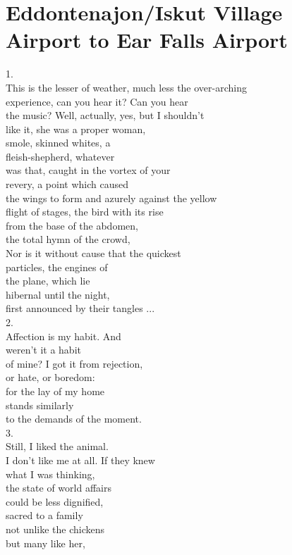 \documentclass[smalldemyvopaper,11pt,twoside,onecolumn,openright,extrafontsizes]{memoir}
\begin{document}
\chapter{Eddontenajon/Iskut Village Airport to Ear Falls Airport}
1.
\\This is the lesser of weather, much less the over-arching
\\experience, can you hear it? Can you hear
\\the music? Well, actually, yes, but I shouldn't
\\like it, she was a proper woman,
\\smole, skinned whites, a
\\fleish-shepherd, whatever
\\was that, caught in the vortex of your
\\revery, a point which caused
\\the wings to form and azurely against the yellow
\\flight of stages, the bird with its rise
\\from the base of the abdomen,
\\the total hymn of the crowd,
\\Nor is it without cause that the quickest
\\particles, the engines of
\\the plane, which lie
\\hibernal until the night,
\\first announced by their tangles ...
\\2.
\\Affection is my habit. And
\\weren't it a habit
\\of mine? I got it from rejection,
\\or hate, or boredom:
\\for the lay of my home
\\stands similarly
\\to the demands of the moment.
\\3.
\\Still, I liked the animal.
\\I don't like me at all. If they knew
\\what I was thinking,
\\the state of world affairs
\\could be less dignified,
\\sacred to a family
\\not unlike the chickens
\\but many like her,
\end{document}
